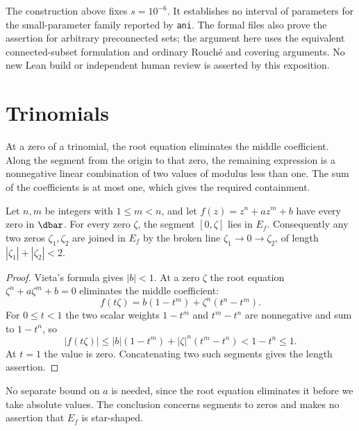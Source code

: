 The construction above fixes $s=10^{-6}$. It establishes no interval of
parameters for the small-parameter family reported by \texttt{ani}.
The formal files also prove the assertion for arbitrary preconnected sets;
the argument here uses the equivalent connected-subset formulation and
ordinary Rouch\'e and covering arguments. No new Lean build or independent
human review is asserted by this exposition.

\section{Trinomials}
\label{sec:trinomials}

At a zero of a trinomial, the root equation eliminates the middle
coefficient. Along the segment from the origin to that zero, the
remaining expression is a nonnegative linear combination of two values
of modulus less than one. The sum of the coefficients is at most one,
which gives the required containment.

\begin{theorem}
\label{res:trinomial-all-degree}
Let $n,m$ be integers with $1\le m<n$, and let $f(z)=z^n+az^m+b$ have every
zero in $\dbar$.  For every zero $\zeta$, the segment $[0,\zeta]$ lies in
$E_f$.  Consequently any two zeros $\zeta_1,\zeta_2$ are joined in $E_f$ by
the broken line $\zeta_1\to0\to\zeta_2$, of length $|\zeta_1|+|\zeta_2|<2$.
\end{theorem}

\begin{proof}
Vieta's formula gives $|b|<1$.  At a zero $\zeta$ the root equation
$\zeta^n+a\zeta^m+b=0$ eliminates the middle coefficient:
\begin{equation}\label{eq:trinomial-cancellation}
 f(t\zeta)=b(1-t^m)+\zeta^n(t^n-t^m).
\end{equation}
For $0\le t<1$ the two scalar weights $1-t^m$ and $t^m-t^n$ are nonnegative
and sum to $1-t^n$, so
\[
 |f(t\zeta)|\le|b|(1-t^m)+|\zeta|^n(t^m-t^n)<1-t^n\le1 .
\]
At $t=1$ the value is zero.  Concatenating two such segments gives the length
assertion.
\end{proof}

No separate bound on $a$ is needed, since the root equation eliminates
it before we take absolute values.  The conclusion concerns segments to zeros and
makes no assertion that $E_f$ is star-shaped.


